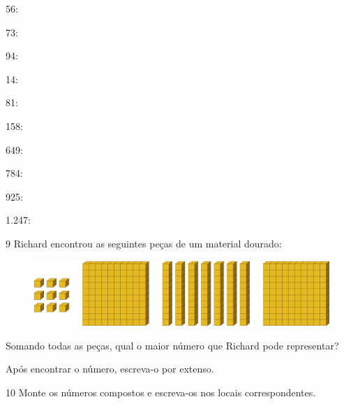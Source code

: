 \begin{escolha}
\item 56: 

\item 73: 

\item 94: 

\item 14: 

\item 81: 

\item 158: 

\item 649: 

\item 784: 

\item 925: 

\item 1.247: 
\end{escolha}

\pagebreak

\num{9} Richard encontrou as seguintes peças de um material dourado:

\begin{figure}[htpb!]
\includegraphics[width=\textwidth]{./media/image4.png}
\end{figure}

Somando todas as peças, qual o maior número que Richard pode representar? 

Após encontrar o número, escreva-o por extenso.

\num{10} Monte os números compostos e escreva-os nos locais correspondentes.

